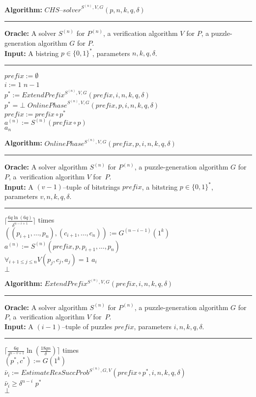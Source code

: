 \begin{codeblock}
  \textbf{Algorithm:} $\mathit{CHS\text{--}solver}^{S^{(n)},V,G}(p, n, k, q, \delta)$
  \medskip\hrule
  \textbf{Oracle:} A solver $S^{(n)}$ for $P^{(n)}$, a verification algorithm $V$ for $P$, a puzzle-generation algorithm $G$ for $P$.\\
  \textbf{Input:}  A bistring $p \in \{0,1\}^{*}$, parameters $n, k, q, \delta$.
  \medskip\hrule
  $\mathit{prefix} := \emptyset$\\
  \For $i := 1$ \To $n\!-\!1$ \Do \\
  \IndI $p^* := \mathit{ExtendPrefix}^{S^{(n)}, V, G}(\mathit{prefix}, i, n, k, q, \delta)$\\
  \IndI \If $p^* = \bot$ \Then \Return $\mathit{OnlinePhase}^{S^{(n)}, V, G}(\mathit{prefix}, p, i, n, k, q, \delta)$ \\
  \IndI \Else $\mathit{prefix} := \mathit{prefix} \circ p^*$\\
  $ a^{(n)} := S^{(n)}(\mathit{prefix} \circ p)$ \\
  \Return $a_n$
\end{codeblock}
%
\begin{codeblock}
  \textbf{Algorithm:} $\mathit{OnlinePhase^{S^{(n)}, V, G}(\mathit{prefix}, p, i, n, k, q, \delta)}$
  \medskip \hrule
  \textbf{Oracle:} A solver algorithm $S^{(n)}$ for $P^{(n)}$, a puzzle-generation algorithm $G$ for $P$, a~verification algorithm $V$ for~$P$.\\
  \textbf{Input:} A $(v-1)$--tuple of bitstrings $\mathit{prefix}$, a bitstring $p \in \{0,1\}^{*}$, \\ parameters $v, n, k, q, \delta$.
  \medskip\hrule
  \Repeat $\Big\lceil\frac{6q \ln (6q)}{\delta^{n-i+1}}\Big\rceil$ times \\
  \IndI $((p_{i+1}, \dotsc, p_{n}),(c_{i+1}, \dots, c_n)) := G^{(n-i-1)}(1^k)$\\
  \IndI $a^{(n)} := S^{(n)}(\mathit{prefix}, p, p_{i+1}, \dotsc, p_n)$\\
  \IndI \If $\forall_{i+1 \leq j \leq n} V(p_j, c_j, a_j) = 1$ \Then \Return $a_i$\\
  \Return $\bot$
\end{codeblock}
%
\begin{codeblock}
  \textbf{Algorithm:} $\mathit{ExtendPrefix^{S^{(n)}, V, G}(prefix, i, n, k, q, \delta)}$
  \medskip \hrule
  \textbf{Oracle:} A solver algorithm $S^{(n)}$ for $P^{(n)}$, a puzzle-generation algorithm $G$ for $P$, a~verification algorithm $V$ for~$P$.\\
  \textbf{Input:} A $(i-1)$--tuple of puzzles $\mathit{prefix}$, parameters $i, n, k, q, \delta$.
  \medskip\hrule
  \Repeat $\Big\lceil \frac{6q}{\delta^{n-v+1}} \ln (\frac{18qn}{\delta}) \Big\rceil$ times \\
  \IndI $(p^*, c^*) := G(1^k) $\\
  \IndI $\bar{\nu}_i := \mathit{EstimateResSuccProb}^{S^{(n)},G,V}(\mathit{prefix} \circ p^*, i, n, k, q, \delta)$\\
  \IndI \If $\bar{\nu}_i \geq \delta^{n-i}$ \Then \Return $p^*$ \\
  \Return $\bot$
\end{codeblock}
